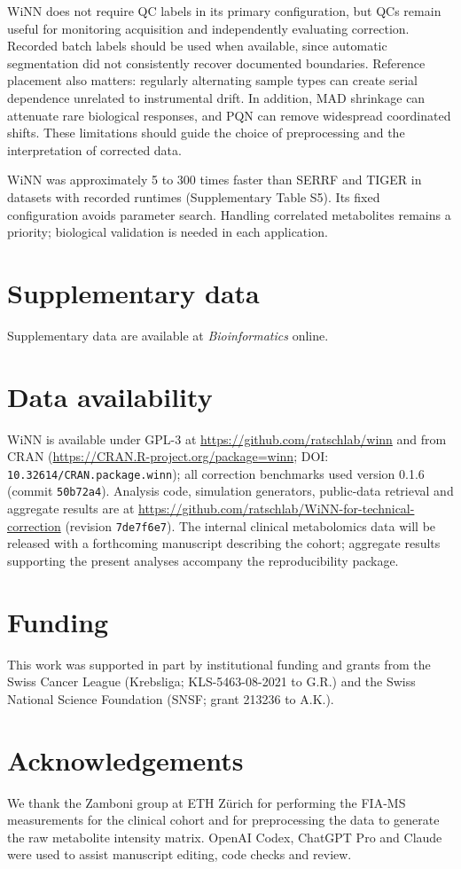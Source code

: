 \documentclass[namedate,webpdf,modern,large,nocrop]{oup-authoring-template}
\begin{document}
WiNN does not require QC labels in its primary configuration, but QCs remain useful for monitoring acquisition and independently evaluating correction. Recorded batch labels should be used when available, since automatic segmentation did not consistently recover documented boundaries. Reference placement also matters: regularly alternating sample types can create serial dependence unrelated to instrumental drift. In addition, MAD shrinkage can attenuate rare biological responses, and PQN can remove widespread coordinated shifts. These limitations should guide the choice of preprocessing and the interpretation of corrected data.

WiNN was approximately 5 to 300 times faster than SERRF and TIGER in datasets with recorded runtimes (Supplementary Table S5). Its fixed configuration avoids parameter search. Handling correlated metabolites remains a priority; biological validation is needed in each application.

\section*{Supplementary data}
Supplementary data are available at \textit{Bioinformatics} online.

\section*{Data availability}
WiNN is available under GPL-3 at \url{https://github.com/ratschlab/winn} and from CRAN (\url{https://CRAN.R-project.org/package=winn}; DOI: \nolinkurl{10.32614/CRAN.package.winn}); all correction benchmarks used version 0.1.6 (commit \texttt{50b72a4}). Analysis code, simulation generators, public-data retrieval and aggregate results are at \url{https://github.com/ratschlab/WiNN-for-technical-correction} (revision \texttt{7de7f6e7}). The internal clinical metabolomics data will be released with a forthcoming manuscript describing the cohort; aggregate results supporting the present analyses accompany the reproducibility package.

\section*{Funding}
This work was supported in part by institutional funding and grants from the Swiss Cancer League (Krebsliga; KLS-5463-08-2021 to G.R.) and the Swiss National Science Foundation (SNSF; grant 213236 to A.K.).

\section*{Acknowledgements}
We thank the Zamboni group at ETH Zürich for performing the FIA-MS measurements for the clinical cohort and for preprocessing the data to generate the raw metabolite intensity matrix. OpenAI Codex, ChatGPT Pro and Claude were used to assist manuscript editing, code checks and review.
\end{document}
